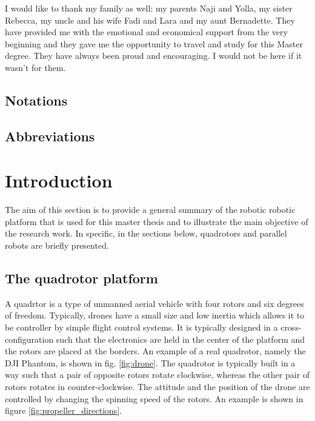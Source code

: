 \documentclass{thesisreport}
\begin{document}
I would like to thank my family as well: my parents Naji and Yolla, my sister Rebecca, my uncle and his wife Fadi and Lara and my aunt Bernadette. They have provided me with the emotional and economical support from the very beginning and they gave me the opportunity to travel and study for this Master degree. They have always been proud and encouraging. I would not be here if it wasn't for them.

 
 \newpage
 
 
 \section*{Notations}
 
 \newpage
 
  \section*{Abbreviations}
 
 \newpage
 
 \listoffigures
 
\listoftables
 
 \tableofcontents
 
 
 \chapter*{Introduction}
 	The aim of this section is to provide a general summary of the robotic robotic platform that is used for this master thesis and to illustrate the main objective of the research work.
In specific, in the sections below, quadrotors and parallel robots are briefly presented.


 
 
\section*{The quadrotor platform}

A quadrtor is a type of unmanned aerial vehicle with four rotors and six degrees of freedom. Typically, drones have a small size and low inertia which allows it to be controller by simple flight control systems. It is typically designed in a cross-configuration such that the electronics are held in the center of the platform and the rotors are placed at the borders.
An example of a real quadrotor, namely the DJI Phantom, is shown in fig. \ref{fig:drone}. The quadrotor is typically built in a way such that a pair of opposite rotors rotate clockwise, whereas the other pair of rotors rotates in counter-clockwise.
The attitude and the position of the drone are controlled by changing the spinning speed of the rotors. An example is shown in figure \ref{fig:propeller_directions}.
\end{document}
